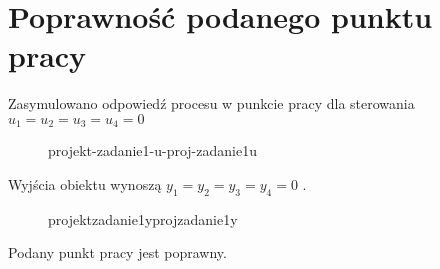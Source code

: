 \section{Poprawność podanego punktu pracy}
\label{projekt:zad1}

Zasymulowano	odpowiedź	procesu	w	punkcie	pracy	dla	sterowania	
$u_{1} = u_{2} = u_{3} = u_{4} = 0$	

\ifdefined\CompileFigures
   \begin{figure}[H] 
      \centering
      
      \caption{projekt-zadanie1-u-proj-zadanie1u}
      \label{projekt:zad1:figure:proj_zadanie1u}
   \end{figure}
\fi

Wyjścia obiektu wynoszą $y_{1} = y_{2} = y_{3} = y_{4} = 0$	.

\ifdefined\CompileFigures
   \begin{figure}[H] 
      \centering
      
      \caption{projektzadanie1yprojzadanie1y}
      \label{projekt:zad1:figure:proj_zadanie1y}
   \end{figure}
\fi

Podany  punkt pracy jest poprawny.

\newpage
